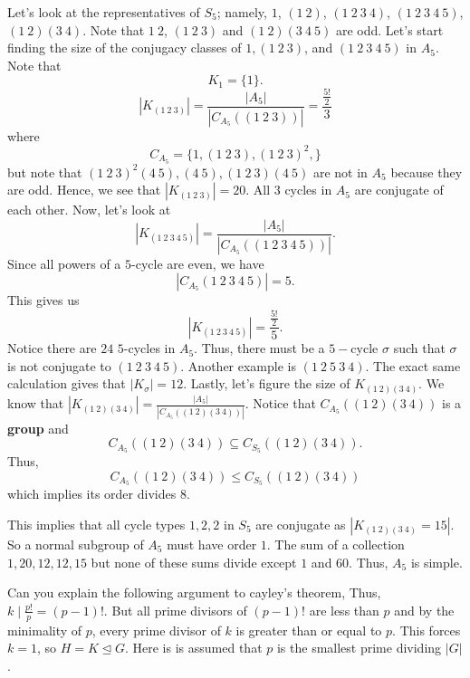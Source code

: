 Let's look at the representatives of \( {S}_{5}  \); namely, \( 1  \), \( (1 \ 2)  \), \( (1 \ 2 \ 3 \ 4) \), \( (1 \ 2 \ 3 \ 4 \ 5) \), \( (1 \ 2 ) (3 \ 4) \). Note that \( 1 \ 2  \), \( (1 \ 2 \ 3) \) and \( (1 \ 2 ) ( 3 \ 4 \ 5) \) are odd. Let's start finding the size of the conjugacy classes of \(  1 , (1 \ 2 \ 3) \), and \( ( 1 \ 2 \ 3 \ 4 \ 5) \) in \( {A}_{5} \). Note that  
\[  {K}_{1} = \{ 1  \}.  \]
\[ | {K}_{(1 \ 2 \ 3 )}   |  = \frac{ | {A}_{5} |    }{  | {C}_{{A}_{5}}((1 \ 2 \ 3)) |  }  = \frac{ \frac{ 5!  }{  2  }  }{ 3 }  \]
where 
\[  {C}_{{A}_{5}} = \{ 1 , (1 \ 2 \ 3), (1 \  2 \ 3 )^{2},  \}  \]
but note that \( (1 \ 2 \ 3)^{2} ( 4 \ 5), (4 \ 5), (1 \ 2 \ 3 )(4 \ 5)  \) are not in \( {A}_{5} \) because they are odd.
Hence, we see that \( | {K}_{(1 \ 2 \ 3)} |  = 2 0 \). All \( 3  \) cycles in \( {A}_{5} \) are conjugate of each other. Now, let's look at \[ | {K}_{(1 \ 2 \ 3 \ 4 \ 5)  } |  = \frac{ | {A}_{5} |   }{ | {C}_{{A}_{5}}((1 \ 2 \ 3 \ 4 \ 5)) |  }.  \]
Since all powers of a \( 5  \)-cycle are even, we have 
\[  | {C}_{{A}_{5}}(1 \ 2 \ 3 \ 4 \ 5) |  = 5.  \]
This gives us 
\[  | {K}_{(1 \ 2 \ 3 \ 4 \ 5)} | = \frac{ \frac{ 5!  }{  2  }  }{  5 }.  \]
Notice there are \( 2 4  \) \( 5 \)-cycles in \( {A}_{5} \). Thus, there must be a \( 5- \)cycle \( \sigma \) such that \( \sigma  \) is not conjugate to \( (1 \ 2 \ 3 \ 4  \ 5) \). Another example is \( ( 1 \ 2 \ 5 \ 3 \ 4) \). The exact same calculation gives that \( | {K}_{\sigma} | = 12  \). Lastly, let's figure the size of \( {K}_{(1 \ 2 )( 3 \ 4)} \). We know that \( |{K}_{(1 \ 2)(3 \ 4)} | = \frac{ | {A}_{5} |  }{ | {C}_{{A}_{5}} ((1 \ 2 )(3 \ 4)) |  }  \). Notice that \( {C}_{{A}_{5}}((1 \ 2 )(3 \ 4)) \) is a \textbf{group} and  
\[  {C}_{{A}_{5}}((1 \ 2)(3 \ 4)) \subseteq  {C}_{{S}_{5}}((1 \ 2)(3 \ 4)). \]
Thus, 
\[  {C}_{{A}_{5}}((1 \ 2)(3 \ 4)) \leq {C}_{{S}_{5}}((1 \ 2)(3 \ 4)) \]
which implies its order divides \( 8  \).

This implies that all cycle types \( 1 , 2, 2  \) in \( {S}_{5} \) are conjugate as \( | {K}_{(1 \ 2)(3 \ 4)} = 15 |  \). So a normal subgroup of \( {A}_{5} \) must have order \( 1  \). The sum of a collection \( 1, 20, 12, 12, 15  \) but none of these sums divide except \( 1  \) and \( 60  \). Thus, \( {A}_{5} \) is simple.


Can you explain the following argument to cayley's theorem, Thus, \(k \mid \frac{ p!  }{  p  }  = (p-1)! \). But all prime divisors of \( (p-1)! \) are less than \( p  \) and by the minimality of \( p  \), every prime divisor of \(  k  \) is greater than or equal to \( p  \). This forces \( k = 1  \), so \( H = K \trianglelefteq G  \). Here is is assumed that \( p  \) is the smallest prime dividing \(  | G  |  \).
